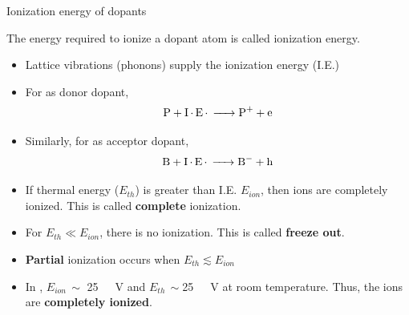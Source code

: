 \begin{frame}{Ionization energy of dopants}
	\begin{definition}
		The energy required to ionize a dopant atom is called ionization energy.
	\end{definition}
	{\footnotesize
	\begin{itemize}
		\item Lattice vibrations (phonons) supply the ionization energy (I.E.)
		\item For  as donor dopant,
		\[
		\ce{P + I.E. -> P^+ + e}
		\]
		\item Similarly, for  as acceptor dopant,
		\[
		\ce{B + I.E. -> B^- + h}
		\]
		\item If thermal energy (\(E_{th}\)) is greater than I.E. \(E_{ion}\), then ions are completely ionized. This is called \textbf{complete} ionization.
		\item For \(E_{th} \ll E_{ion}\), there is no ionization. This is called \textbf{freeze out}.
		\item \textbf{Partial} ionization occurs when \(E_{th} \lesssim E_{ion}\) 
		\item In , \(E_{ion} \, \sim \) \SI{25}{\milli\electron\volt} and  \(E_{th} \, \sim\)\SI{25}{\milli\electron\volt} at room temperature. Thus, the ions are \textbf{completely ionized}.
	\end{itemize}}
\end{frame}